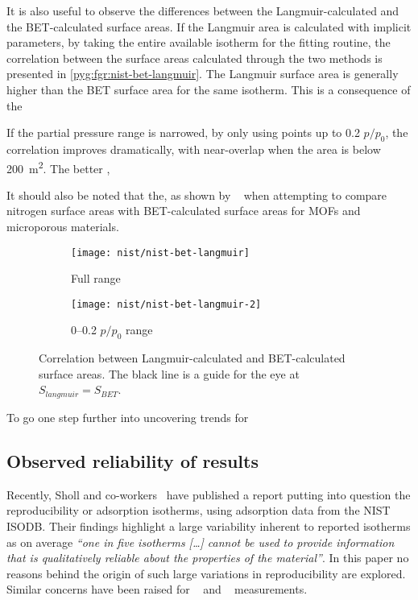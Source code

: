 It is also useful to observe the differences between the 
Langmuir-calculated and the BET-calculated surface areas.
If the Langmuir area is calculated with implicit parameters,
by taking the entire available isotherm for the fitting
routine, the correlation between the surface areas
calculated through the two methods is presented in 
\autoref{pyg:fgr:nist-bet-langmuir}. The Langmuir surface 
area is generally higher than the BET surface area for the 
same isotherm. This is a consequence of the 

If the partial pressure range is narrowed, by only using 
points up to 0.2 \(p/p_0\), the correlation improves 
dramatically, with near-overlap when the area is below 
\SI{200}{\metre^2}. The better ,

It should also be noted that the, as shown by 
\citeauthor{waltonApplicabilityBETMethod2007}
~\cite{waltonApplicabilityBETMethod2007} when attempting to
compare nitrogen surface areas with BET-calculated 
surface areas for MOFs and microporous materials.

\begin{figure}[htb]
    \centering

    \begin{subfigure}{0.42\linewidth}
        \texttt{[image: nist/nist-bet-langmuir]}
        \caption{Full range}%
        \label{pyg:fgr:nist-bet-langmuir}
    \end{subfigure}%
    \begin{subfigure}{0.5\linewidth}
        \texttt{[image: nist/nist-bet-langmuir-2]}
        \caption{0--0.2 \(p/p_0\) range}%
        \label{pyg:fgr:nist-bet-langmuir-adj}
    \end{subfigure}%

    \caption{Correlation between Langmuir-calculated and 
    BET-calculated surface areas. The black line is a guide
    for the eye at \(S_{langmuir} = S_{BET}\).}%
    \label{pyg:fgr:nist-area-cmp}
\end{figure}

To go one step further into uncovering trends for 

\subsection{Observed reliability of results}

Recently, Sholl and co-workers~\cite{parkHowReproducibleAre2017}
have published a report putting into question the reproducibility
or adsorption isotherms, using  adsorption data from the 
NIST ISODB. Their findings highlight a large variability inherent
to reported isotherms as on average \textit{``one in five  
isotherms [\ldots] cannot be used to provide information that 
is qualitatively reliable about the properties of the material''}.
In this paper no reasons behind the origin of such large
variations in reproducibility are explored. Similar concerns have been
raised for ~\cite{broomIrreproducibilityHydrogenStorage2016}
and ~\cite{espinalMeasurementStandardsData2013} measurements.

